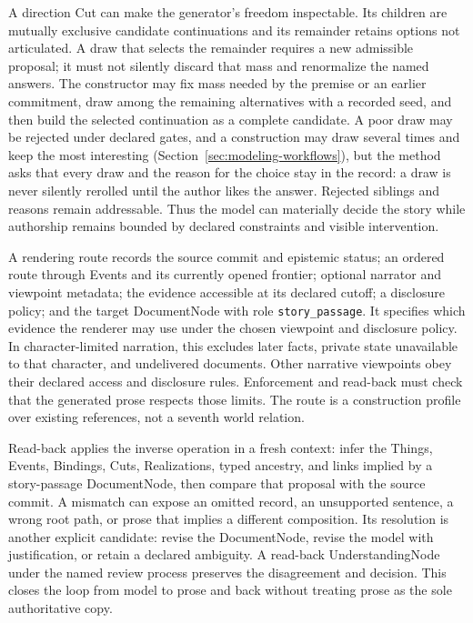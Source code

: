 \documentclass[11pt,a4paper]{article}
\begin{document}
A direction Cut can make the generator's freedom inspectable. Its children are
mutually exclusive candidate continuations and its remainder retains options
not articulated. A draw that selects the remainder requires a new admissible
proposal; it must not silently discard that mass and renormalize the named
answers. The constructor may fix mass needed by the premise or an
earlier commitment, draw among the remaining alternatives with a recorded seed,
and then build the selected continuation as a complete candidate. A poor draw
may be rejected under declared gates, and a construction may draw several times
and keep the most interesting (Section~\ref{sec:modeling-workflows}), but the
method asks that every draw and the reason for the choice stay in the record: a
draw is never silently rerolled until the author likes the answer. Rejected siblings and reasons remain
addressable.
Thus the model can materially decide the story while authorship remains bounded
by declared constraints and visible intervention.

A rendering route records the source commit and epistemic status; an ordered
route through Events and its currently opened frontier; optional narrator and
viewpoint metadata; the evidence accessible at its declared cutoff; a
disclosure policy; and the target DocumentNode with role
\texttt{story\_passage}. It specifies which evidence the renderer may use
under the chosen viewpoint and disclosure policy. In character-limited
narration, this excludes later facts, private state unavailable to that
character, and undelivered documents. Other narrative viewpoints obey their
declared access and disclosure rules. Enforcement and read-back must check that
the generated prose respects those limits. The route is a construction profile over existing
references, not a seventh world relation.

Read-back applies the inverse operation in a fresh context: infer the Things,
Events, Bindings, Cuts, Realizations, typed ancestry, and links implied by a story-passage
DocumentNode, then compare that proposal with the source commit. A mismatch can
expose an omitted record, an unsupported sentence, a wrong root path, or prose
that implies a different composition. Its resolution is another explicit
candidate: revise the DocumentNode, revise the model with justification, or
retain a declared ambiguity. A read-back UnderstandingNode under the named
review process preserves the disagreement and decision. This closes the loop
from model to prose and back without treating prose as the sole authoritative
copy.
\end{document}
